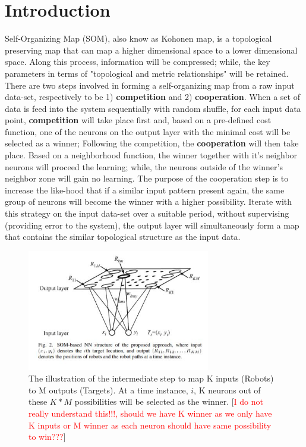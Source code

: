 \section{Introduction}
Self-Organizing Map (SOM), also know as Kohonen map, is a topological preserving map that can map a higher dimensional space to a lower dimensional space. Along this process, information will be compressed; while, the key parameters in terms of "topological and metric relationships"\cite{Kohonen1998} will be retained. 
\\
There are two steps involved in forming a self-organizing map from a raw input data-set\cite{hebbian2007}, respectively to be 1) \textbf{competition} and 2) \textbf{cooperation}. When a set of data is feed into the system sequentially with random shuffle, for each input data point, \textbf{competition} will take place first and, based on a pre-defined cost function, one of the neurons on the output layer with the minimal cost will be selected as a winner; Following the competition, the  \textbf{cooperation} will then take place. Based on a neighborhood function, the winner together with it's neighbor neurons will proceed the learning; while, the neurons outside of the winner's neighbor zone will gain no learning. The purpose of the cooperation step is to increase the like-hood that if a similar input pattern present again, the same group of neurons will become the winner with a higher possibility. Iterate with this strategy on the input data-set over a suitable period, without supervising (providing error to the system), the output layer will simultaneously form a map that contains the similar topological structure as the input data. 



\begin{figure}[h]
  \centering
  \includegraphics[width=8cm]{Picture/AnminPic.JPG}
  \caption{The illustration of the intermediate step to map K inputs (Robots) to M outputs (Targets)\cite{zhu2006neural}. At a time instance, $i$, K neurons out of these $K*M$ possibilities will be selected as the winner. [\textcolor{red}{I do not really understand this!!!, should we have K winner as we only have K inputs or M winner as each neuron should have same possibility to win???}] }
\end{figure}

